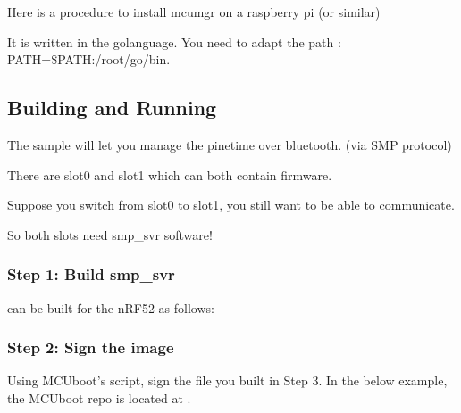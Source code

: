 \documentclass[letterpaper,10pt,english]{sphinxmanual}
\begin{document}
Here is a procedure to install mcumgr on a raspberry pi  (or similar)

It is written in the go\sphinxhyphen{}language. You need to adapt the path :   PATH=\$PATH:/root/go/bin.


\subsection{Building and Running}
\label{\detokenize{fota/smp_svr:building-and-running}}
The sample will let you manage the pinetime over bluetooth. (via SMP protocol)

There are slot0 and slot1 which can both contain firmware.

Suppose you switch from slot0 to slot1, you still want to be able to communicate.

So both slots need smp\_svr software!


\subsubsection{Step 1: Build smp\_svr}
\label{\detokenize{fota/smp_svr:step-1-build-smp-svr}}
 can be built for the nRF52 as follows:



\subsubsection{Step 2: Sign the image}
\label{\detokenize{fota/smp_svr:step-2-sign-the-image}}
Using MCUboot’s  script, sign the 
file you built in Step 3. In the below example, the MCUboot repo is located at
.

\begin{sphinxVerbatim}[commandchars=\\\{\}]
\end{sphinxVerbatim}
\end{document}

